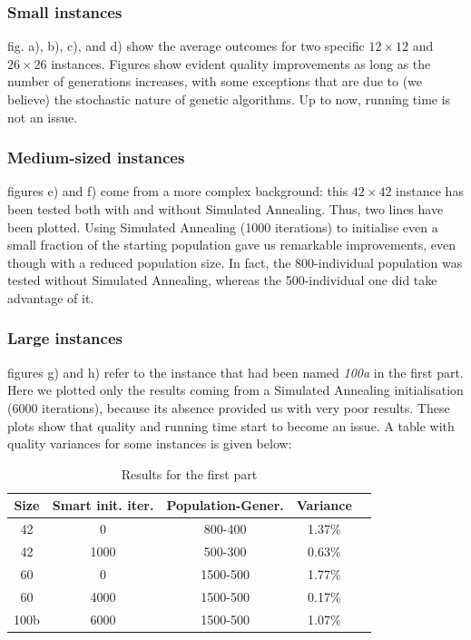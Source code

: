 \documentclass[letterpaper, 10 pt, conference]{ieeeconf}  %
\begin{document}
\subsubsection{Small instances} fig. a), b), c), and d) show
the average outcomes for two specific $12\times12$ and $26\times26$ instances. Figures show evident quality improvements as long as the number of generations increases, with some exceptions that are due to (we believe) the stochastic nature of genetic algorithms. Up to now, running time is not an issue.
\subsubsection{Medium-sized instances} figures e) and f) come from a more complex background: this $42\times42$ instance has been tested both with and without Simulated Annealing. Thus, two lines have been plotted. Using Simulated Annealing (1000 iterations) to initialise even a small fraction of the starting population gave us remarkable improvements, even though with a reduced population size. In fact, the 800-individual population was tested without Simulated Annealing, whereas the 500-individual one did take advantage of it.
\subsubsection{Large instances} figures g) and h) refer to the instance that had been named \textit{100a} in the first part.
Here we plotted only the results coming from a Simulated Annealing initialisation (6000 iterations), because its absence 
provided us with very poor results. These plots show that quality 
and running time start to become an issue.
\newline
A table with quality variances for some instances is given below:
\begin{table}[h]
\caption{Results for the first part}
\label{table_example}
\begin{center}
\begin{tabular}{|c|c|c|c|c|}
\hline
\textbf{Size} & \textbf{Smart init. iter.} & \textbf{Population-Gener.} & \textbf{Variance}\\
\hline
42 &  0 & 800-400 & 1.37\%\\
\hline
42 & 1000 & 500-300 & 0.63\% \\
\hline
60 & 0 & 1500-500 & 1.77\%\\
\hline
60 & 4000 & 1500-500 &  0.17\% \\
\hline
100b & 6000 & 1500-500 & 1.07\% \\
\hline
\end{tabular}
\end{center}
\end{table}
\end{document}
